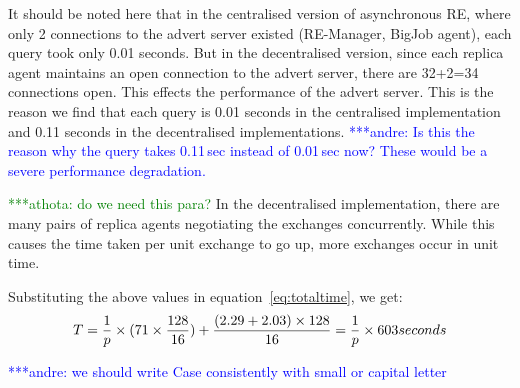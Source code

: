 \documentclass{rspublic}
\newcommand{\jhanote}[1]{ {\textcolor{red} { ***shantenu: #1 }}}
\newcommand{\alnote}[1]{ {\textcolor{blue} { ***andre: #1 }}}
\newcommand{\athotanote}[1]{ {\textcolor{green} { ***athota: #1 }}}
\newcommand{\alnote}[1]{}
\newcommand{\athotanote}[1]{}
\newcommand{\jhanote}[1]{}
\begin{document}
It should be noted here that in the centralised version of
asynchronous RE, where only 2 connections to the advert server existed
(RE-Manager, BigJob agent), each query took only 0.01 seconds. But in
the decentralised version, since each replica agent maintains an open
connection to the advert server, there are 32+2=34 connections
open. This effects the performance of the advert server. This is the reason we find that each query is 0.01 seconds in the centralised implementation and 0.11 seconds in the decentralised implementations. \alnote{Is this the reason why
the query takes 0.11\,sec instead of 0.01\,sec now? These would be a severe performance
degradation.}

\athotanote{ do we need this para?}In the decentralised implementation, there are many pairs of
replica agents negotiating the exchanges concurrently. While this
causes the time taken per unit exchange to go up, more exchanges occur
in unit time.

Substituting the above values in equation~\ref{eq:totaltime}, we get:
\begin{eqnarray}
T=  {1 \over p} \times {{(71\times {128\over 16}}) + {(2.29+2.03)\times 128\over 16}} = {1 \over p} \times 603 seconds
\label{eq:decent}
\end{eqnarray}




\alnote{we should write Case consistently with small or capital letter}
\end{document}
